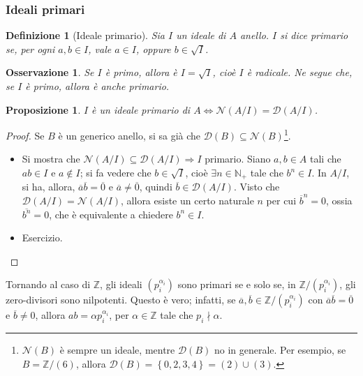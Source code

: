 \documentclass[12pt]{scrartcl}
\theoremstyle{style}
\newtheorem{definizione}{Definizione}[section]
\newtheorem{prop}{Proposizione}[section]
\newtheorem{osservazione}{Osservazione}[section]
\theoremstyle{style1}
\numberwithin{equation}{subsection}
\begin{document}
\subsubsection{Ideali primari}
\begin{definizione}
	[Ideale primario]
	Sia $I$ un ideale di $A$ anello.
	$I$ si dice \textit{primario} se, per ogni $a,b\in I$, vale $a\in I$, oppure $b \in \sqrt{I} $.
\end{definizione}
\begin{osservazione}
Se $I$ \`e primo, allora \`e $I = \sqrt{I} $, cio\`e $I$ \`e radicale.
Ne segue che, se $I$ \`e primo, allora \`e anche primario.
\end{osservazione}
\begin{prop}
$I$ \`e un ideale primario di $A\iff \mathcal{N} (A / I) = \mathcal{D} (A / I)$. 
\end{prop}
\begin{proof}
	Se $B$ \`e un generico anello, si sa gi\`a che $\mathcal{D} (B) \subseteq \mathcal{N} (B)$\footnote{$\mathcal{N} (B)$ \`e sempre un ideale, mentre $\mathcal{D} (B)$ no in generale. Per esempio, se $B = \mathbb{Z}/(6)$, allora $\mathcal{D} (B) = \left\{ 0,2,3,4 \right\} = (2) \cup (3)$.}.

	\begin{itemize}
		\item[$(\Leftarrow)$] Si mostra che $\mathcal{N} (A / I) \subseteq \mathcal{D} (A / I) \Rightarrow I$ primario.
			Siano $a,b \in A$ tali che $ab \in I$ e $a\not\in I$; si fa vedere che $b \in \sqrt{I} $, cio\`e $\exists n \in \mathbb{N}_+$ tale che $b^n \in I$.
			In $A / I$, si ha, allora, $\overline{a}\overline{b}=\overline{0}$ e $\overline{a}\neq \overline{0}$, quindi $\overline{b} \in \mathcal{D} (A / I)$.
			Visto che $\mathcal{D} (A / I) = \mathcal{N} (A / I)$, allora esiste un certo naturale $n$ per cui $\overline{b}^n = 0$, ossia $\overline{b^n}=0$, che \`e equivalente a chiedere $b^n \in I$.
		\item[$(\Rightarrow )$] {\color{red} Esercizio.}
	\end{itemize}
\end{proof}
\noindent Tornando al caso di $\mathbb{Z}$, gli ideali $\left(p_i^{\alpha _i} \right) $ sono primari se e solo se, in $\mathbb{Z}/(p_i^{\alpha _i}) $, gli zero-divisori sono nilpotenti.
Questo \`e vero; infatti, se $\overline{a},\overline{b} \in \mathbb{Z}/(p_i^{\alpha _i} )$ con $\overline{a}\overline{b}=\overline{0}$ e $\overline{b}\neq 0$, allora $ab = \alpha p_i^{\alpha _i} $, per $\alpha \in \mathbb{Z}$ tale che $p_i  \nmid \alpha $.
\end{document}
